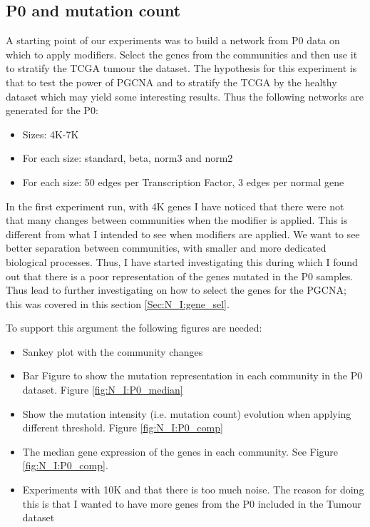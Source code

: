 

\subsection{P0 and mutation count}

A starting point of our experiments was to build a network from P0 data on which to apply modifiers. Select the genes from the communities and then use it to stratify the TCGA tumour the dataset. The hypothesis for this experiment is that to test the power of PGCNA and to stratify the TCGA by the healthy dataset which may yield some interesting results. Thus the following networks are generated for the P0:

\begin{itemize}
    \item Sizes: 4K-7K
    \item For each size: standard, beta, norm3 and norm2
    \item For each size: 50 edges per Transcription Factor, 3 edges per normal gene
\end{itemize}


In the first experiment run, with 4K genes I have noticed that there were not that many changes between communities when the modifier is applied. This is different from what I intended to see when modifiers are applied. We want to see better separation between communities, with smaller and more dedicated biological processes. Thus, I have started investigating this during which I found out that there is a poor representation of the genes mutated in the P0 samples. Thus lead to further investigating on how to select the genes for the PGCNA; this was covered in this section \ref{Sec:N_I:gene_sel}.

To support this argument the following figures are needed:
\begin{itemize}
    \item Sankey plot with the community changes
    \item Bar Figure to show the mutation representation in each community in the P0 dataset. Figure \ref{fig:N_I:P0_median}
    \item Show the mutation intensity (i.e. mutation count) evolution when applying different threshold.  Figure \ref{fig:N_I:P0_comp}
    \item The median gene expression of the genes in each community. See Figure \ref{fig:N_I:P0_comp}.
    \item Experiments with 10K and that there is too much noise. The reason for doing this is that I wanted to have more genes from the P0 included in the Tumour dataset
\end{itemize}

